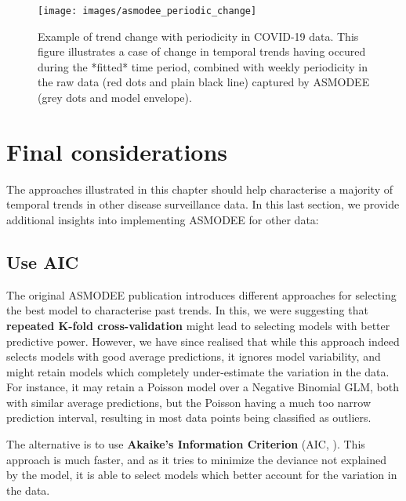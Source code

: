 \documentclass[]{book}
\begin{document}
\begin{figure}

{\centering \texttt{[image: images/asmodee\_periodic\_change]} 

}

\caption{Example of trend change with periodicity in COVID-19 data. This figure illustrates a case of change in temporal trends having occured during the *fitted* time period, combined with weekly periodicity in the raw data (red dots and plain black line) captured by ASMODEE (grey dots and model envelope).}\label{fig:asmodee-periodic-change}
\end{figure}

\hypertarget{final-considerations}{%
\section{Final considerations}\label{final-considerations}}

The approaches illustrated in this chapter should help characterise a majority
of temporal trends in other disease surveillance data. In this last section, we
provide additional insights into implementing ASMODEE for other data:

\hypertarget{use-aic}{%
\subsection{Use AIC}\label{use-aic}}

The original ASMODEE publication \citep{Jombart2021-ws} introduces different
approaches for selecting the best model to characterise past trends. In this, we
were suggesting that \textbf{repeated K-fold cross-validation} might lead to
selecting models with better predictive power. However, we have since realised
that while this approach indeed selects models with good average predictions, it
ignores model variability, and might retain models which completely
under-estimate the variation in the data. For instance, it may retain a Poisson
model over a Negative Binomial GLM, both with similar average predictions, but
the Poisson having a much too narrow prediction interval, resulting in most data
points being classified as outliers.

The alternative is to use \textbf{Akaike's Information Criterion} (AIC,
\citep{Akaike1974-gm}). This approach is much faster, and as it tries to minimize the
deviance not explained by the model, it is able to select models which better
account for the variation in the data.
\end{document}
